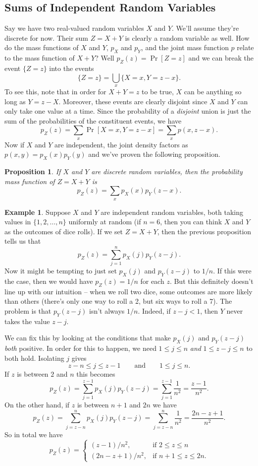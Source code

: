 \documentclass[12pt]{article}
\theoremstyle{plain}
\newtheorem{proposition}[theorem]{Proposition}
\theoremstyle{definition}
\newtheorem{example}[theorem]{Example}
\theoremstyle{remark}
\begin{document}
\subsection{Sums of Independent Random Variables}
Say we have two real-valued random variables $X$ and $Y$.
We'll assume they're discrete for now.
Their sum $Z=X+Y$ is clearly a random variable as well.
How do the mass functions of $X$ and $Y$, $p_X$ and $p_Y$, and the joint mass function $p$ relate to the mass function of $X+Y$?
Well $p_Z(z) = \Pr[Z = z]$ and we can break the event $\{Z = z\}$ into the events
\[
    \{Z = z\} = \bigcup_{x}\{X = x, Y = z-x\}.
\]
To see this, note that in order for $X+Y = z$ to be true, $X$ can be anything so long as $Y = z-X$.
Moreover, these events are clearly disjoint since $X$ and $Y$ can only take one value at a time.
Since the probability of a \emph{disjoint} union is just the sum of the probabilities of the constituent events, we have
\[
    p_Z(z) = \sum_x \Pr[X = x, Y= z-x] = \sum_x p(x, z-x).
\]
Now if $X$ and $Y$ are independent, the joint density factors as $p(x,y) = p_X(x)p_Y(y)$ and we've proven the following proposition.
\begin{proposition}
    If $X$ and $Y$ are discrete random variables, then the probability mass function of $Z = X+Y$ is
    \[
        p_Z(z) = \sum_x p_X(x)p_Y(z-x).
    \]
\end{proposition}

\begin{example}
    Suppose $X$ and $Y$ are independent random variables, both taking values in $\{1, 2, \ldots, n\}$ uniformly at random (if $n=6$, then you can think $X$ and $Y$ as the outcomes of dice rolls).
    If we set $Z = X+Y$, then the previous proposition tells us that
    \[
        p_Z(z) = \sum_{j = 1}^np_X(j)p_Y(z-j).
    \]
    Now it might be tempting to just set $p_X(j)$ and $p_Y(z-j)$ to $1/n$.
    If this were the case, then we would have $p_Z(z) = 1/n$ for each $z$.
    But this definitely doesn't line up with our intuition -- when we roll two dice, some outcomes are more likely than others (there's only one way to roll a 2, but six ways to roll a 7).
    The problem is that $p_Y(z-j)$ isn't always $1/n$.
    Indeed, if $z-j < 1$, then $Y$ never takes the value $z-j$.

    We can fix this by looking at the conditions that make $p_X(j)$ and $p_Y(z-j)$ \emph{both} positive.
    In order for this to happen, we need $1\leq j\leq n$ \emph{and} $1\leq z-j\leq n$ to both hold.
    Isolating $j$ gives
    \[
        z-n \leq j\leq z-1 \qquad\text{and}\qquad 1\leq j\leq n.
    \]
    If $z$ is between $2$ and $n$ this becomes
    \[
        p_Z(z) = \sum_{j=1}^{z-1}p_X(j)p_Y(z-j) = \sum_{j=1}^{z-1}\frac{1}{n^2} = \frac{z-1}{n^2}. 
    \]
    On the other hand, if $z$ is between $n+1$ and $2n$ we have
    \[
        p_Z(z) = \sum_{j=z-n}^n p_X(j)p_Y(z-j) = \sum_{j=z-n}^n\frac{1}{n^2} = \frac{2n-z+1}{n^2}.
    \]
    So in total we have
    \[
        p_Z(z) = \begin{cases}
            (z-1)/n^2,&\text{if }2\leq z \leq n\\
            (2n-z+1)/n^2,&\text{if }n+1\leq z\leq 2n.
        \end{cases}
    \]
\end{example}
\end{document}
